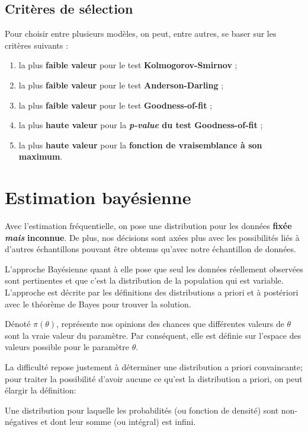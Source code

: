\documentclass[10pt, french]{article}
\begin{document}
\begin{multicols*}{3}
\subsection*{Critères de sélection}
Pour choisir entre plusieurs modèles, on peut, entre autres, se baser sur les critères suivants : 
\begin{enumerate}
\item la plus \textbf{faible valeur} pour le test \textbf{Kolmogorov-Smirnov} ; 
\item la plus \textbf{faible valeur} pour le test \textbf{Anderson-Darling} ;
\item la plus \textbf{faible valeur} pour le test \textbf{Goodness-of-fit} ;
\item la plus \textbf{haute valeur} pour la \textbf{\emph{p-value} du test Goodness-of-fit} ; 
\item la plus \textbf{haute valeur} pour la \textbf{fonction de vraisemblance à son maximum}.
\end{enumerate}

\setcounter{section}{12}
\section{Estimation bayésienne}

Avec l'estimation fréquentielle, on pose une distribution pour les données \textbf{fixée} \textit{\textbf{mais}} \textbf{inconnue}. De plus, nos décisions sont axées plus avec les possibilités liés à d'autres échantillons pouvant être obtenus qu'avec notre échantillon de données.

L'approche Bayésienne quant à elle pose que seul les données réellement observées sont pertinentes et que c'est la distribution de la population qui est variable.
L'approche est décrite par les définitions des distributions a priori et à postériori avec le théorème de Bayes pour trouver la solution.

\begin{definition}
Dénoté $\pi(\theta)$, représente nos opinions des chances que différentes valeurs de $\theta$ sont la vraie valeur du paramètre. 
Par conséquent, elle est définie sur l'espace des valeurs possible pour le paramètre $\theta$.
\end{definition}

La difficulté repose justement à déterminer une distribution a priori convaincante; pour traiter la possibilité d'avoir aucune ce qu'est la distribution a priori, on peut élargir la définition:
\begin{definition}
Une distribution pour laquelle les probabilités (ou fonction de densité) sont non-négatives et dont leur somme (ou intégral) est infini.
\end{definition}


\end{multicols*}
\end{document}
